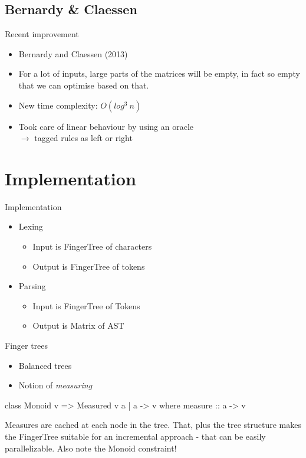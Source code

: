 \documentclass{beamer}
\begin{document}
\subsection{Bernardy \& Claessen}
\begin{frame}{Recent improvement}
    \begin{itemize}
        \item Bernardy and Claessen (2013)
        \item For a lot of inputs, large parts of the matrices will be empty, in
              fact so empty that we can optimise based on that.
        \item New time complexity: $O(log^3\ n)$
        \item Took care of linear behaviour by using an oracle \\
              $\rightarrow$ tagged rules as left or right
    \end{itemize}
\end{frame}

\section{Implementation}

\begin{frame}{Implementation}
    \begin{itemize}
        \item Lexing
            \begin{itemize}
                \item Input is FingerTree of characters
                \item Output is FingerTree of tokens
            \end{itemize}
        \item Parsing
            \begin{itemize}
                \item Input is FingerTree of Tokens
                \item Output is Matrix of AST
            \end{itemize}
    \end{itemize}
\end{frame}

\begin{frame}[fragile]{Finger trees}
    \begin{itemize}
        \item Balanced trees
        \item Notion of \textit{measuring}
    \end{itemize}

    \begin{code}
    class Monoid v => Measured v a | a -> v where
        measure :: a -> v
    \end{code}

    Measures are cached at each node in the tree. That, plus the tree structure
    makes the FingerTree suitable for an incremental approach - that can be
    easily parallelizable. Also note the Monoid constraint!
\end{frame}
\end{document}
